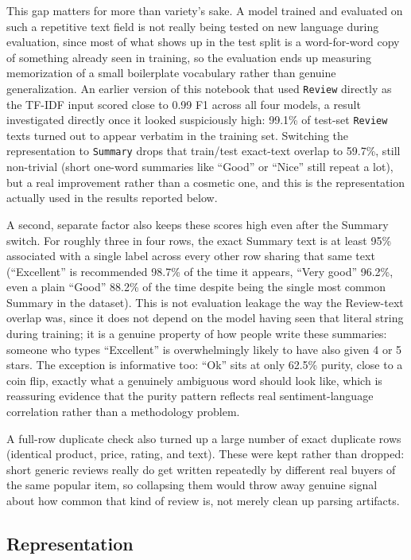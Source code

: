 \documentclass[11pt]{article}
\begin{document}
This gap matters for more than variety's sake. A model trained and evaluated on such a
repetitive text field is not really being tested on new language during evaluation, since
most of what shows up in the test split is a word-for-word copy of something already seen
in training, so the evaluation ends up measuring memorization of a small boilerplate
vocabulary rather than genuine generalization. An earlier version of this notebook that used
\texttt{Review} directly as the TF-IDF input scored close to 0.99 F1 across all four
models, a result investigated directly once it looked suspiciously high: 99.1\% of
test-set \texttt{Review} texts turned out to appear verbatim in the training set. Switching
the representation to \texttt{Summary} drops that train/test exact-text overlap to 59.7\%,
still non-trivial (short one-word summaries like ``Good'' or ``Nice'' still repeat a lot),
but a real improvement rather than a cosmetic one, and this is the representation actually
used in the results reported below.

A second, separate factor also keeps these scores high even after the Summary switch. For
roughly three in four rows, the exact Summary text is at least 95\% associated with a
single label across every other row sharing that same text (``Excellent'' is recommended
98.7\% of the time it appears, ``Very good'' 96.2\%, even a plain ``Good'' 88.2\% of the
time despite being the single most common Summary in the dataset). This is not evaluation
leakage the way the Review-text overlap was, since it does not depend on the model having
seen that literal string during training; it is a genuine property of how people write
these summaries: someone who types ``Excellent'' is overwhelmingly likely to have also
given 4 or 5 stars. The exception is informative too: ``Ok'' sits at only 62.5\% purity,
close to a coin flip, exactly what a genuinely ambiguous word should look like, which is
reassuring evidence that the purity pattern reflects real sentiment-language correlation
rather than a methodology problem.

A full-row duplicate check also turned up a large number of exact duplicate rows
(identical product, price, rating, and text). These were kept rather than dropped: short
generic reviews really do get written repeatedly by different real buyers of the same
popular item, so collapsing them would throw away genuine signal about how common that
kind of review is, not merely clean up parsing artifacts.

\subsection{Representation}
\end{document}
